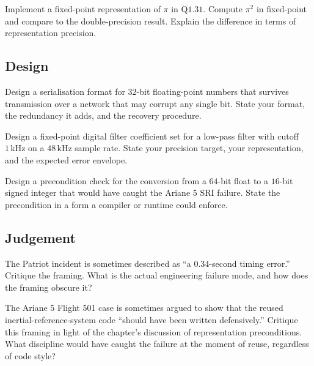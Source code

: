 \begin{exercise}
Implement a fixed-point representation of $\pi$ in Q$1.31$. Compute $\pi^2$ in fixed-point and compare to the double-precision result. Explain the difference in terms of representation precision.
\end{exercise}

\subsection*{Design}

\begin{exercise}
Design a serialisation format for $32$-bit floating-point numbers that survives transmission over a network that may corrupt any single bit. State your format, the redundancy it adds, and the recovery procedure.
\end{exercise}

\begin{exercise}
Design a fixed-point digital filter coefficient set for a low-pass filter with cutoff $1\,\si{\kilo\hertz}$ on a $48\,\si{\kilo\hertz}$ sample rate. State your precision target, your representation, and the expected error envelope.
\end{exercise}

\begin{exercise}
Design a precondition check for the conversion from a $64$-bit float to a $16$-bit signed integer that would have caught the Ariane 5 SRI failure. State the precondition in a form a compiler or runtime could enforce.
\end{exercise}

\subsection*{Judgement}

\begin{exercise}
The Patriot incident is sometimes described as ``a $0.34$-second timing error.'' Critique the framing. What is the actual engineering failure mode, and how does the framing obscure it?
\end{exercise}

\begin{exercise}
The Ariane 5 Flight 501 case \cite{acc:ariane501-ifr} is sometimes argued to show that the reused inertial-reference-system code ``should have been written defensively.'' Critique this framing in light of the chapter's discussion of representation preconditions. What discipline would have caught the failure at the moment of reuse, regardless of code style?
\end{exercise}

